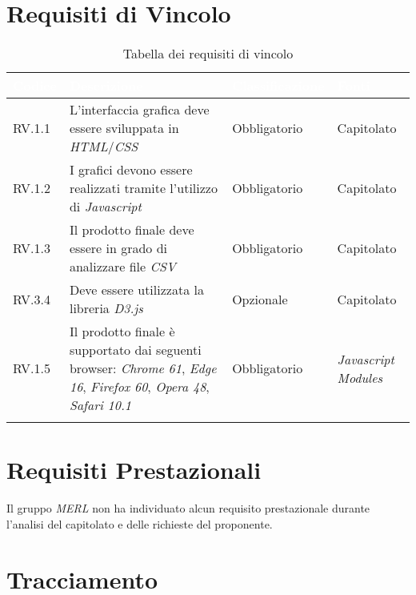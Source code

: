 \section{Requisiti di Vincolo}
\begin{center}
  \centering
  \begin{longtable}{|L{1,5cm}|C{5,5cm}|C{3cm}|C{2cm}|}
    \hline
    \textcolor[HTML]{FFFFFF}{\textbf{Codice}} & \textcolor[HTML]{FFFFFF}{\textbf{Descrizione}} & \textcolor[HTML]{FFFFFF}{\textbf{Classificazione}} & \textcolor[HTML]{FFFFFF}{\textbf{Fonti}}
    \\ \hline
    RV.1.1 & L'interfaccia grafica deve essere sviluppata in \textit{HTML}/\textit{CSS} & Obbligatorio & Capitolato \\ \hline
    RV.1.2 & I grafici devono essere realizzati tramite l'utilizzo di \textit{Javascript} & Obbligatorio & Capitolato \\ \hline
    RV.1.3 & Il prodotto finale deve essere in grado di analizzare file \textit{CSV} & Obbligatorio & Capitolato \\ \hline
    RV.3.4 & Deve essere utilizzata la libreria \textit{D3.js} & Opzionale & Capitolato \\ \hline
    RV.1.5 & Il prodotto finale è supportato dai seguenti browser: \textit{Chrome 61}, \textit{Edge 16}, \textit{Firefox 60}, \textit{Opera 48}, \textit{Safari 10.1} & Obbligatorio & \textit{Javascript Modules} \\ \hline


    \caption{Tabella dei requisiti di vincolo}
  \end{longtable}
\end{center}

\section{Requisiti Prestazionali}
Il gruppo \textit{MERL} non ha individuato alcun requisito prestazionale durante l'analisi del capitolato e delle richieste del proponente.


\section{Tracciamento}

